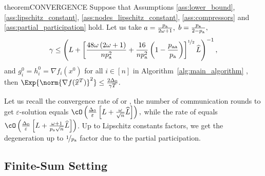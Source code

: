 \documentclass{article}
\newcommand{\algorithmname}{DASHA-PP}
\newcommand*{\probavailable}{\ensuremath{p_{\textnormal{a}}}}
\newcommand*{\probpairaa}{\ensuremath{p_{\textnormal{aa}}}}
\begin{document}
\label{sec:gradien_setting}

\begin{restatable}{theorem}{CONVERGENCE}
  \label{theorem:gradient_oracle}
  Suppose that Assumptions \ref{ass:lower_bound}, \ref{ass:lipschitz_constant}, \ref{ass:nodes_lipschitz_constant}, \ref{ass:compressors} and \ref{ass:partial_participation} hold. Let us take $a = \frac{\probavailable}{2 \omega + 1} ,$ $b = \frac{\probavailable}{2 - \probavailable},$ {\scriptsize \begin{align*}\gamma \leq \left(L + \left[\frac{48 \omega \left(2 \omega + 1\right)}{n \probavailable^2} + \frac{16}{n \probavailable^2}\left(1 - \frac{\probpairaa}{\probavailable}\right)\right]^{\nicefrac{1}{2}}\widehat{L}\right)^{-1},\end{align*}} and $g^{0}_i = h^{0}_i = \nabla f_i(x^0)$ for all $i \in [n]$
  in Algorithm~\ref{alg:main_algorithm} \algname{(\algorithmname)}, then $\Exp{\norm{\nabla f(\widehat{x}^T)}^2} \leq \frac{2 \Delta_0}{\gamma T}.$
\end{restatable}

Let us recall the convergence rate of  or , the number of communication rounds to get $\varepsilon$-solution equals
$\cO\left(\frac{\Delta_0}{\varepsilon}\left[L + \frac{\omega}{\sqrt{n}}\widehat{L}\right]\right),$ while the rate of \algname{\algorithmname} equals $\cO\left(\frac{\Delta_0}{\varepsilon}\left[L + \frac{\omega + 1}{\probavailable \sqrt{n}}\widehat{L}\right]\right)$. Up to Lipschitz constants factors, we get the degeneration up to $\nicefrac{1}{\probavailable}$ factor due to the partial participation.

\subsection{Finite-Sum Setting}

\label{sec:finite_sum_setting}
\end{document}
